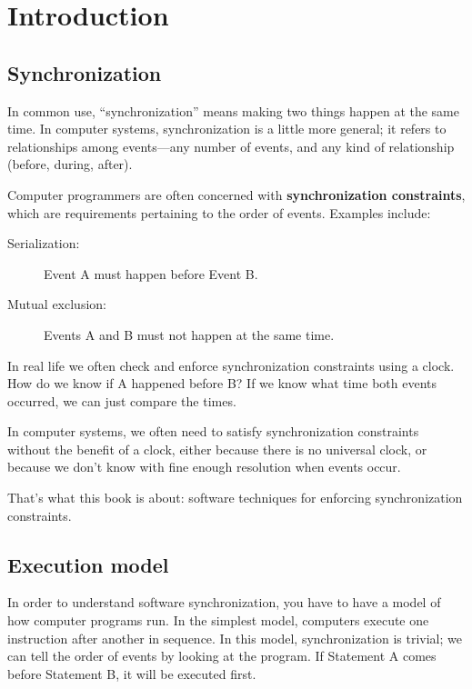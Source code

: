 \documentclass{book}
\newcommand{\clearemptydoublepage}{\newpage\cleardoublepage}
\begin{document}

\tableofcontents
\clearemptydoublepage

\mainmatter


\chapter{Introduction}

\section{Synchronization}
\label{synch}

In common use, ``synchronization'' means making two things happen
at the same time.  In computer systems, synchronization is a little
more general; it refers to relationships among events---any number
of events, and any kind of relationship (before, during, after).

Computer programmers are often concerned with {\bf synchronization
constraints}, which are requirements pertaining to the order of
events.  Examples include:

\begin{description}

\item[Serialization:] Event A must happen before Event B.

\item[Mutual exclusion:] Events A and B must not happen at the same time.

\end{description}

In real life we often check and enforce synchronization constraints 
using a clock.  How do we know if A happened before B?  If we
know what time both events occurred, we can just compare the times.

In computer systems, we often need to satisfy synchronization
constraints without the benefit of a clock, either because there
is no universal clock, or because we don't know with fine enough
resolution when events occur.

That's what this book is about: software techniques for enforcing
synchronization constraints.


\section {Execution model}

In order to understand software synchronization, you have to
have a model of how computer programs run.  In the simplest
model, computers execute one instruction after another in
sequence.  In this model, synchronization is trivial; we can
tell the order of events by looking at the program.  If Statement
A comes before Statement B, it will be executed first.
\end{document}

